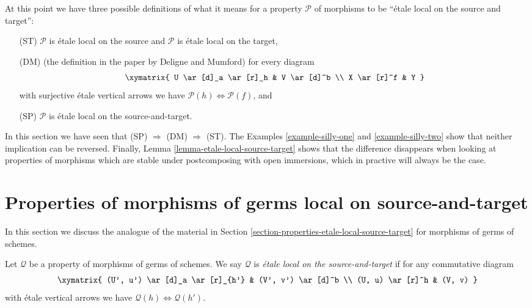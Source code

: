 \begin{remark}
\label{remark-compare-definitions}
At this point we have three possible definitions of what it means for a
property $\mathcal{P}$ of morphisms to be ``\'etale local on the source and
target'':
\begin{enumerate}
\item[(ST)] $\mathcal{P}$ is \'etale local on the source and $\mathcal{P}$ is
\'etale local on the target,
\item[(DM)] (the definition in the paper \cite[Page 100]{DM} by
Deligne and Mumford) for every diagram
$$
\xymatrix{
U \ar[d]_a \ar[r]_h & V \ar[d]^b \\
X \ar[r]^f & Y
}
$$
with surjective \'etale vertical arrows we have
$\mathcal{P}(h) \Leftrightarrow \mathcal{P}(f)$, and
\item[(SP)] $\mathcal{P}$ is \'etale local on the source-and-target.
\end{enumerate}
In this section we have seen that (SP) $\Rightarrow$ (DM) $\Rightarrow$ (ST).
The
Examples \ref{example-silly-one} and \ref{example-silly-two}
show that neither implication can be reversed. Finally,
Lemma \ref{lemma-etale-local-source-target}
shows that the difference disappears when looking at properties of
morphisms which are stable under postcomposing with open immersions, which
in practive will always be the case.
\end{remark}






\section{Properties of morphisms of germs local on source-and-target}
\label{section-local-source-target-at-point}

\noindent
In this section we discuss the analogue of the material in
Section \ref{section-properties-etale-local-source-target}
for morphisms of germs of schemes.

\begin{definition}
\label{definition-local-source-target-at-point}
Let $\mathcal{Q}$ be a property of morphisms of germs of schemes.
We say $\mathcal{Q}$ is  {\it \'etale local on the source-and-target}
if for any commutative diagram
$$
\xymatrix{
(U', u') \ar[d]_a \ar[r]_{h'} & (V', v') \ar[d]^b \\
(U, u) \ar[r]^h & (V, v)
}
$$
with \'etale vertical arrows we have
$\mathcal{Q}(h) \Leftrightarrow \mathcal{Q}(h')$.
\end{definition}

